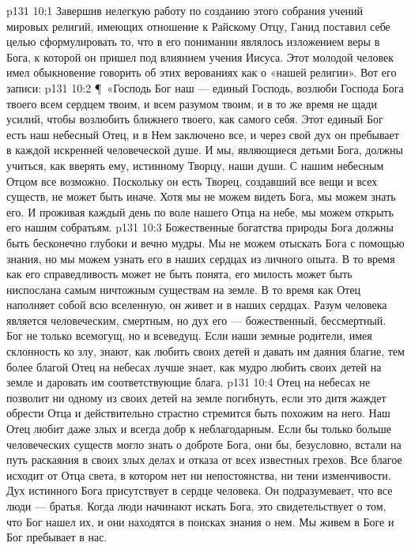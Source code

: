 \vs p131 10:1 Завершив нелегкую работу по созданию этого собрания учений мировых религий, имеющих отношение к Райскому Отцу, Ганид поставил себе целью сформулировать то, что в его понимании являлось изложением веры в Бога, к которой он пришел под влиянием учения Иисуса. Этот молодой человек имел обыкновение говорить об этих верованиях как о «нашей религии». Вот его записи:
\vs p131 10:2 \P\ «Господь Бог наш --- единый Господь, возлюби Господа Бога твоего всем сердцем твоим, и всем разумом твоим, и в то же время не щади усилий, чтобы возлюбить ближнего твоего, как самого себя. Этот единый Бог есть наш небесный Отец, и в Нем заключено все, и через свой дух он пребывает в каждой искренней человеческой душе. И мы, являющиеся детьми Бога, должны учиться, как вверять ему, истинному Творцу, наши души. С нашим небесным Отцом все возможно. Поскольку он есть Творец, создавший все вещи и всех существ, не может быть иначе. Хотя мы не можем видеть Бога, мы можем знать его. И проживая каждый день по воле нашего Отца на небе, мы можем открыть его нашим собратьям.
\vs p131 10:3 Божественные богатства природы Бога должны быть бесконечно глубоки и вечно мудры. Мы не можем отыскать Бога с помощью знания, но мы можем узнать его в наших сердцах из личного опыта. В то время как его справедливость может не быть понята, его милость может быть ниспослана самым ничтожным существам на земле. В то время как Отец наполняет собой всю вселенную, он живет и в наших сердцах. Разум человека является человеческим, смертным, но дух его --- божественный, бессмертный. Бог не только всемогущ, но и всеведущ. Если наши земные родители, имея склонность ко злу, знают, как любить своих детей и давать им даяния благие, тем более благой Отец на небесах лучше знает, как мудро любить своих детей на земле и даровать им соответствующие блага.
\vs p131 10:4 Отец на небесах не позволит ни одному из своих детей на земле погибнуть, если это дитя жаждет обрести Отца и действительно страстно стремится быть похожим на него. Наш Отец любит даже злых и всегда добр к неблагодарным. Если бы только больше человеческих существ могло знать о доброте Бога, они бы, безусловно, встали на путь раскаяния в своих злых делах и отказа от всех известных грехов. Все благое исходит от Отца света, в котором нет ни непостоянства, ни тени изменчивости. Дух истинного Бога присутствует в сердце человека. Он подразумевает, что все люди --- братья. Когда люди начинают искать Бога, это свидетельствует о том, что Бог нашел их, и они находятся в поисках знания о нем. Мы живем в Боге и Бог пребывает в нас.
